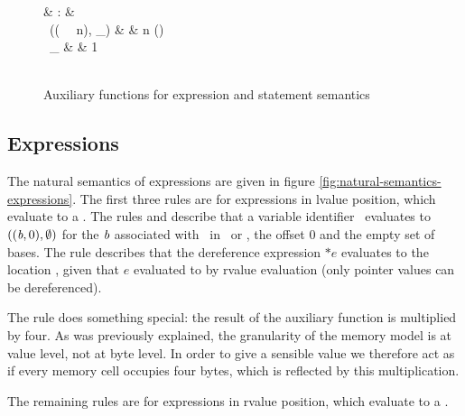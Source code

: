 \begin{figure}[h]
\begin{functioncode}
{                                                       &   :           & \Type \rightarrow \Intdomain \\
 \ (( \ \tau \ n), \_)               & \triangleq    & n \times {}(\tau) \\
 \ \_                                                  & \triangleq    & 1 \\~\\
}
\end{functioncode}
\caption{Auxiliary functions for expression and statement semantics}
\label{figure:Auxiliary-functions}
\end{figure}

\newpage

\subsection{Expressions}
The natural semantics of expressions are given in figure \ref{fig:natural-semantics-expressions}.
The first three rules are for expressions in lvalue position, which evaluate to a \Loc.
The rules  and  describe that a variable identifier \Idvar \ evaluates to $((\textit{b}, 0), \emptyset)$ for the $\textit{b}$
associated with \Idvar \ in \Envvar \ or \Globalsvar, the offset 0 and the empty set of bases.
The rule  describes that the dereference expression $*e$ evaluates to the location \Locvar, given that $e$ evaluated to \ptr{\Locvar} by
rvalue evaluation (\ie only pointer values can be dereferenced). 

The rule  does something special: the result of the auxiliary  
function is multiplied by four.
As was previously explained, the granularity of the memory model is at value level, not at byte level.
In order to give a sensible value we therefore act as if every memory cell occupies four bytes, which is reflected by this multiplication.

The remaining rules are for expressions in rvalue position, which evaluate to a \Val.

